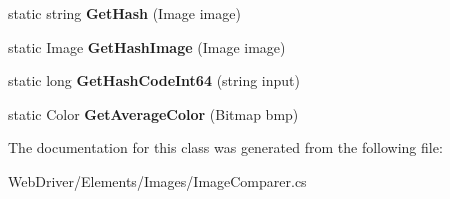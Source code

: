 \begin{DoxyCompactItemize}
\item 
\hypertarget{class_proto_test_1_1_golem_1_1_web_driver_1_1_elements_1_1_images_1_1_image_comparer_acc937bf34decfa907edac25dbcb0f3ce}{static string {\bfseries Get\-Hash} (Image image)}\label{class_proto_test_1_1_golem_1_1_web_driver_1_1_elements_1_1_images_1_1_image_comparer_acc937bf34decfa907edac25dbcb0f3ce}

\item 
\hypertarget{class_proto_test_1_1_golem_1_1_web_driver_1_1_elements_1_1_images_1_1_image_comparer_a9da0ea0dc01fa399f4d1ea3ec31c99a3}{static Image {\bfseries Get\-Hash\-Image} (Image image)}\label{class_proto_test_1_1_golem_1_1_web_driver_1_1_elements_1_1_images_1_1_image_comparer_a9da0ea0dc01fa399f4d1ea3ec31c99a3}

\item 
\hypertarget{class_proto_test_1_1_golem_1_1_web_driver_1_1_elements_1_1_images_1_1_image_comparer_a26a00a05b0f353dad9b836bf01df7138}{static long {\bfseries Get\-Hash\-Code\-Int64} (string input)}\label{class_proto_test_1_1_golem_1_1_web_driver_1_1_elements_1_1_images_1_1_image_comparer_a26a00a05b0f353dad9b836bf01df7138}

\item 
\hypertarget{class_proto_test_1_1_golem_1_1_web_driver_1_1_elements_1_1_images_1_1_image_comparer_a368b42983555b656dbe7ad332a0bed1c}{static Color {\bfseries Get\-Average\-Color} (Bitmap bmp)}\label{class_proto_test_1_1_golem_1_1_web_driver_1_1_elements_1_1_images_1_1_image_comparer_a368b42983555b656dbe7ad332a0bed1c}

\end{DoxyCompactItemize}


The documentation for this class was generated from the following file\-:\begin{DoxyCompactItemize}
\item 
Web\-Driver/\-Elements/\-Images/Image\-Comparer.\-cs\end{DoxyCompactItemize}

